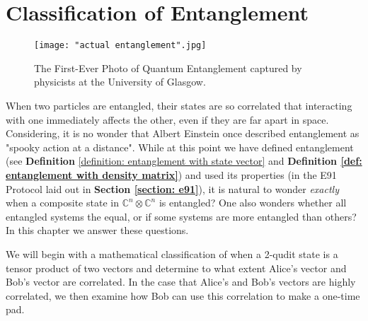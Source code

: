 
\chapter{Classification of Entanglement} %

\label{Chapter6-classification of entanglement} %
\begin{figure}[h]
    \centering
    \texttt{[image: "actual entanglement".jpg]}
    \caption{The First-Ever Photo of Quantum Entanglement captured by physicists at the University of Glasgow. \cite{moreau2019imaging}}
    \label{fig:actual entanglemen}
\end{figure}

When two particles are entangled, their states are so correlated that interacting with one immediately affects the other, even if they are far apart in space.  Considering, it is no wonder that Albert Einstein once described entanglement as "spooky action at a distance". While at this point we have defined entanglement (see {\bf{Definition}} \ref{definition: entanglement with state vector} and \textbf{Definition \ref{def: entanglement with density matrix}}) and used its properties (in the E91 Protocol laid out in \textbf{Section \ref{section: e91}}), it is natural to wonder {\emph{exactly}} when a composite state in $\mathbb{C}^n \otimes \mathbb{C}^n$ is entangled?
One also wonders whether all entangled systems the equal, or if some systems are more entangled than others?  In this chapter we answer these questions.




We will begin with a mathematical classification of when a 2-qudit state is a tensor product of two vectors and determine to what extent Alice's vector and Bob's vector are correlated. In the case that Alice's and Bob's vectors are highly correlated, we then examine how Bob can use this correlation to make a one-time pad. 



